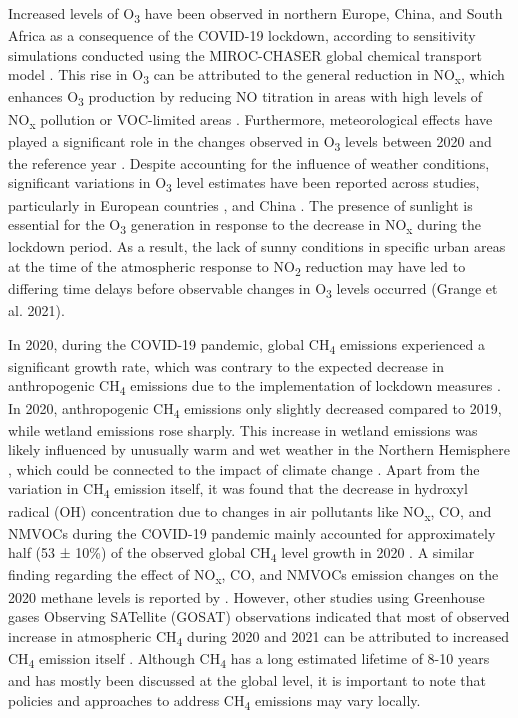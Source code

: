 Increased levels of O\textsubscript{3} have been observed in northern Europe, China, and South Africa as a consequence of the COVID-19 lockdown, according to sensitivity simulations conducted using the MIROC-CHASER global chemical transport model \citep{miyazaki2021global}. This rise in O\textsubscript{3} can be attributed to the general reduction in NO\textsubscript{x}, which enhances O\textsubscript{3} production by reducing NO titration in areas with high levels of NO\textsubscript{x} pollution or VOC-limited areas \citep{akimoto2022rethinking}. Furthermore, meteorological effects have played a significant role in the changes observed in O\textsubscript{3} levels between 2020 and the reference year \citep{ordonez2020early,liu2021diverse}. Despite accounting for the influence of weather conditions, significant variations in O\textsubscript{3} level estimates have been reported across studies, particularly in European countries \citep{ordonez2020early,grange2021covid}, and China \citep{liu2021diverse,shi2021abrupt}. The presence of sunlight is essential for the O\textsubscript{3} generation in response to the decrease in NO\textsubscript{x} during the lockdown period. As a result, the lack of sunny conditions in specific urban areas at the time of the atmospheric response to NO\textsubscript{2} reduction may have led to differing time delays before observable changes in O\textsubscript{3} levels occurred \citep{grange2021covid} (Grange et al. 2021). \par

In 2020, during the COVID-19 pandemic, global CH\textsubscript{4} emissions experienced a significant growth rate, which was contrary to the expected decrease in anthropogenic CH\textsubscript{4} emissions due to the implementation of lockdown measures \citep{peng2022wetland}.  In 2020, anthropogenic CH\textsubscript{4} emissions only slightly decreased compared to 2019, while wetland emissions rose sharply. This increase in wetland emissions was likely influenced by unusually warm and wet weather in the Northern Hemisphere \citep{peng2022wetland}, which could be connected to the impact of climate change \citep{zhang2023recent}. Apart from the variation in CH\textsubscript{4} emission itself, it was found that the decrease in hydroxyl radical (OH) concentration due to changes in air pollutants like NO\textsubscript{x}, CO, and NMVOCs during the COVID-19 pandemic mainly accounted for approximately half (53 ± 10\%) of the observed global CH\textsubscript{4} level growth in 2020 \citep{peng2022wetland}. A similar finding regarding the effect of NO\textsubscript{x}, CO, and NMVOCs emission changes on the 2020 methane levels is reported by \citep{stevenson2022covid}. However, other studies using Greenhouse gases Observing SATellite (GOSAT) observations indicated that most of observed increase in atmospheric CH\textsubscript{4} during 2020 and 2021 can be attributed to increased CH\textsubscript{4} emission itself \citep{qu2022attribution,feng2023methane}. Although CH\textsubscript{4} has a long estimated lifetime of 8-10 years and has mostly been discussed at the global level, it is important to note that policies and approaches to address CH\textsubscript{4} emissions may vary locally. \par

